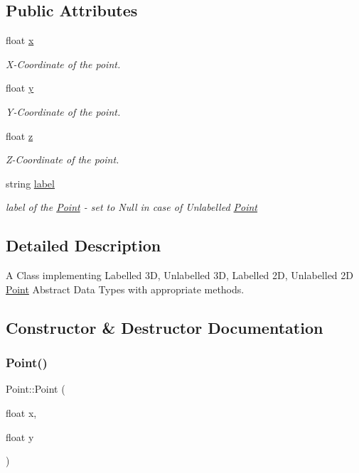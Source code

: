 \subsection*{Public Attributes}
\begin{DoxyCompactItemize}
\item 
float \mbox{\hyperlink{class_point_a05dfe2dfbde813ad234b514f30e662f1}{x}}
\begin{DoxyCompactList}\small\item\em X-\/\+Coordinate of the point. \end{DoxyCompactList}\item 
float \mbox{\hyperlink{class_point_a6101960c8d2d4e8ea1d32c9234bbeb8d}{y}}
\begin{DoxyCompactList}\small\item\em Y-\/\+Coordinate of the point. \end{DoxyCompactList}\item 
float \mbox{\hyperlink{class_point_a9a666531e0e99adff132be93d2407d0c}{z}}
\begin{DoxyCompactList}\small\item\em Z-\/\+Coordinate of the point. \end{DoxyCompactList}\item 
string \mbox{\hyperlink{class_point_a1e929419353f9bec46732af977adb55a}{label}}
\begin{DoxyCompactList}\small\item\em label of the \mbox{\hyperlink{class_point}{Point}} -\/ set to Null in case of Unlabelled \mbox{\hyperlink{class_point}{Point}} \end{DoxyCompactList}\end{DoxyCompactItemize}


\subsection{Detailed Description}
A Class implementing Labelled 3D, Unlabelled 3D, Labelled 2D, Unlabelled 2D \mbox{\hyperlink{class_point}{Point}} Abstract Data Types with appropriate methods. 

\subsection{Constructor \& Destructor Documentation}
\mbox{\label{class_point_a30bc8409287de4f43e160664be834636}} 
\subsubsection{\texorpdfstring{Point()}{Point()}\hspace{0.1cm}{\footnotesize\ttfamily [1/4]}}
{\footnotesize\ttfamily Point\+::\+Point (\begin{DoxyParamCaption}\item[{float}]{x,  }\item[{float}]{y }\end{DoxyParamCaption})}



